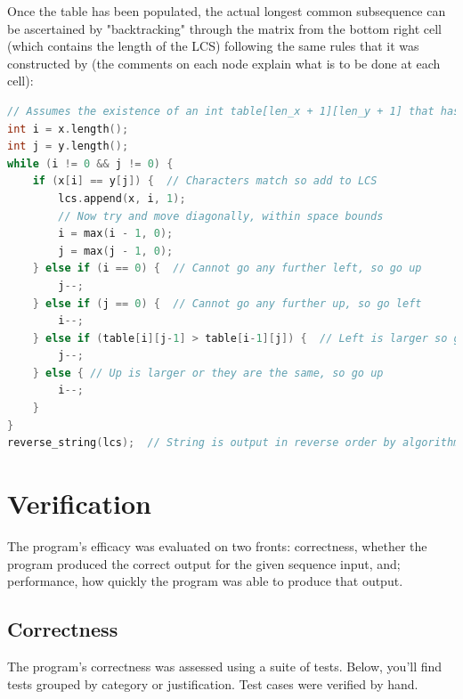 Once the table has been populated, the actual longest common subsequence can be ascertained by "backtracking" through the matrix from the bottom right cell (which contains the length of the LCS) following the same rules that it was constructed by (the comments on each node explain what is to be done at each cell):

\begin{lstlisting}[language=C++, caption=Reconstruction Algorithm]
// Assumes the existence of an int table[len_x + 1][len_y + 1] that has been prepopulated
int i = x.length();
int j = y.length();
while (i != 0 && j != 0) {
    if (x[i] == y[j]) {  // Characters match so add to LCS
        lcs.append(x, i, 1);
        // Now try and move diagonally, within space bounds
        i = max(i - 1, 0); 
        j = max(j - 1, 0);
    } else if (i == 0) {  // Cannot go any further left, so go up
        j--;
    } else if (j == 0) {  // Cannot go any further up, so go left
        i--;
    } else if (table[i][j-1] > table[i-1][j]) {  // Left is larger so go left
        j--;
    } else { // Up is larger or they are the same, so go up
        i--;
    }
}
reverse_string(lcs);  // String is output in reverse order by algorithm, so reverse again
\end{lstlisting}

\section{Verification}

The program's efficacy was evaluated on two fronts: correctness, whether the program produced the correct output for the given sequence input, and; performance, how quickly the program was able to produce that output.

\subsection{Correctness \label{sec:correctness}}
The program's correctness was assessed using a suite of tests. Below, you'll find tests grouped by category or justification. Test cases were verified by hand.

